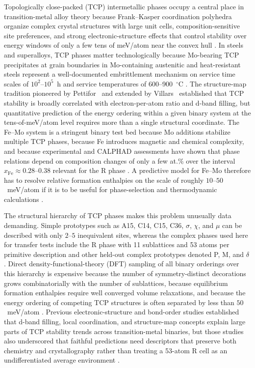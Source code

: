 \documentclass[prb,twocolumn,floatfix]{revtex4-2}
\begin{document}
Topologically close-packed (TCP) intermetallic phases occupy a central place in transition-metal alloy theory because Frank--Kasper coordination polyhedra organize complex crystal structures with large unit cells, composition-sensitive site preferences, and strong electronic-structure effects that control stability over energy windows of only a few tens of meV/atom near the convex hull \cite{FrankKasper1958,FrankKasper1959,Sinha1972}. In steels and superalloys, TCP phases matter technologically because Mo-bearing TCP precipitates at grain boundaries in Mo-containing austenitic and heat-resistant steels represent a well-documented embrittlement mechanism on service time scales of $10^2$--$10^5$~h and service temperatures of 600--900~$^\circ$C \cite{Sinha1972,Joubert2008Sigma,Seiser2011}. The structure-map tradition pioneered by Pettifor~\cite{Pettifor1988} and extended by Villars~\cite{Villars1992} established that TCP stability is broadly correlated with electron-per-atom ratio and d-band filling, but quantitative prediction of the energy ordering within a given binary system at the tens-of-meV/atom level requires more than a single structural coordinate. The Fe--Mo system is a stringent binary test bed because Mo additions stabilize multiple TCP phases, because Fe introduces magnetic and chemical complexity, and because experimental and CALPHAD assessments have shown that phase relations depend on composition changes of only a few at.\% over the interval $x_{\mathrm{Fe}}\approx 0.28$--$0.38$ relevant for the R phase \cite{Joubert2008Sigma,JoubertCrivello2012}. A predictive model for Fe--Mo therefore has to resolve relative formation enthalpies on the scale of roughly $10$--$50$~meV/atom if it is to be useful for phase-selection and thermodynamic calculations \cite{Joubert2008Sigma,Ladines2015}.

The structural hierarchy of TCP phases makes this problem unusually data demanding. Simple prototypes such as A15, C14, C15, C36, $\sigma$, $\chi$, and $\mu$ can be described with only $2$--$5$ inequivalent sites, whereas the complex phases used here for transfer tests include the R phase with 11 sublattices and 53 atoms per primitive description and other held-out complex prototypes denoted P, M, and $\delta$ \cite{FrankKasper1958,FrankKasper1959,HammerschmidtBialon2013}. Direct density-functional-theory (DFT) sampling of all binary orderings over this hierarchy is expensive because the number of symmetry-distinct decorations grows combinatorially with the number of sublattices, because equilibrium formation enthalpies require well converged volume relaxations, and because the energy ordering of competing TCP structures is often separated by less than $50$~meV/atom \cite{HammerschmidtBialon2013,Ladines2015}. Previous electronic-structure and bond-order studies established that d-band filling, local coordination, and structure-map concepts explain large parts of TCP stability trends across transition-metal binaries, but those studies also underscored that faithful predictions need descriptors that preserve both chemistry and crystallography rather than treating a 53-atom R cell as an undifferentiated average environment \cite{Pettifor1995,HammerschmidtSeiser2008,Seiser2011,HammerschmidtBialon2013}.
\end{document}
